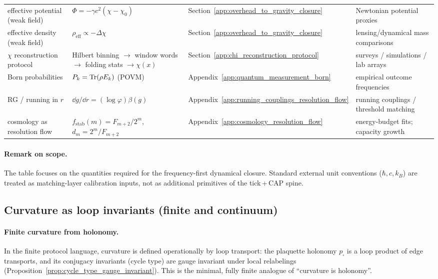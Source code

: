 \begin{longtable}{p{} p{} p{} p{}}
effective potential (weak field) & $\Phi=-\gamma c^2(\chi-\chi_0)$ & Section~\ref{app:overhead_to_gravity_closure} & Newtonian potential proxies \\
effective density (weak field) & $\rho_{\mathrm{eff}}\propto -\Delta\chi$ & Section~\ref{app:overhead_to_gravity_closure} & lensing/dynamical mass comparisons \\
$\chi$ reconstruction protocol & Hilbert binning $\to$ window words $\to$ folding stats $\to \chi(x)$ & Section~\ref{app:chi_reconstruction_protocol} & surveys / simulations / lab arrays \\
Born probabilities & $P_k=\mathrm{Tr}(\rho E_k)$ (POVM) & Appendix~\ref{app:quantum_measurement_born} & empirical outcome frequencies \\
RG / running in $r$ & $\dd g/\dd r=(\log\varphi)\beta(g)$ & Appendix~\ref{app:running_couplings_resolution_flow} & running couplings / threshold matching \\
cosmology as resolution flow & $f_{\mathrm{stab}}(m)=F_{m+2}/2^m$, $d_m=2^m/F_{m+2}$ & Appendix~\ref{app:cosmology_resolution_flow} & energy-budget fits; capacity growth \\
\bottomrule
\end{longtable}

\paragraph{Remark on scope.}
\AuditTag The table focuses on the quantities required for the frequency-first dynamical closure.
Standard external unit conventions ($\hbar,c,k_B$) are treated as matching-layer calibration inputs, not as additional primitives of the tick\,+\,CAP spine.

\subsection{Curvature as loop invariants (finite and continuum)}
\label{subsec:curvature_as_loops}

\paragraph{Finite curvature from holonomy.}
\MathTag In the finite protocol language, curvature is defined operationally by loop transport:
the plaquette holonomy $p_\square$ is a loop product of edge transports, and its conjugacy invariants (cycle type) are gauge invariant under local relabelings (Proposition~\ref{prop:cycle_type_gauge_invariant}).
This is the minimal, fully finite analogue of ``curvature is holonomy''.

